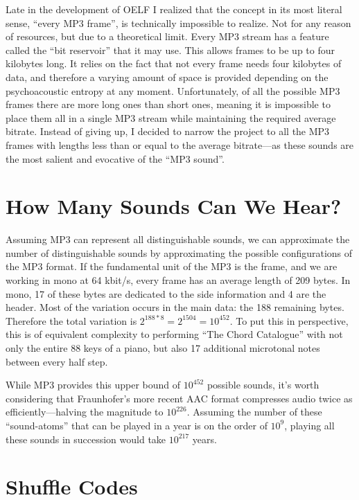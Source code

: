 \documentclass{thesis}
\begin{document}
Late in the development of OELF I realized that the concept in its most literal sense, ``every MP3 frame'', is technically impossible to realize. Not for any reason of resources, but due to a theoretical limit. Every MP3 stream has a feature called the ``bit reservoir'' that it may use. This allows frames to be up to four kilobytes long. It relies on the fact that not every frame needs four kilobytes of data, and therefore a varying amount of space is provided depending on the psychoacoustic entropy at any moment. Unfortunately, of all the possible MP3 frames there are more long ones than short ones, meaning it is impossible to place them all in a single MP3 stream while maintaining the required average bitrate. Instead of giving up, I decided to narrow the project to all the MP3 frames with lengths less than or equal to the average bitrate---as these sounds are the most salient and evocative of the ``MP3 sound''.
	
\section{How Many Sounds Can We Hear?}

Assuming MP3 can represent all distinguishable sounds, we can approximate the number of distinguishable sounds by approximating the possible configurations of the MP3 format. If the fundamental unit of the MP3 is the frame, and we are working in mono at 64 kbit/s, every frame has an average length of 209 bytes. In mono, 17 of these bytes are dedicated to the side information and 4 are the header. Most of the variation occurs in the main data: the 188 remaining bytes. Therefore the total variation is $2^{188*8}=2^{1504}=10^{452}$. To put this in perspective, this is of equivalent complexity to performing ``The Chord Catalogue'' with not only the entire 88 keys of a piano, but also 17 additional microtonal notes between every half step.

While MP3 provides this upper bound of $10^{452}$ possible sounds, it's worth considering that Fraunhofer's more recent AAC format compresses audio twice as efficiently---halving the magnitude to $10^{226}$. Assuming the number of these ``sound-atoms'' that can be played in a year is on the order of $10^9$, playing all these sounds in succession would take $10^{217}$ years.
	
\section{Shuffle Codes}
\end{document}
